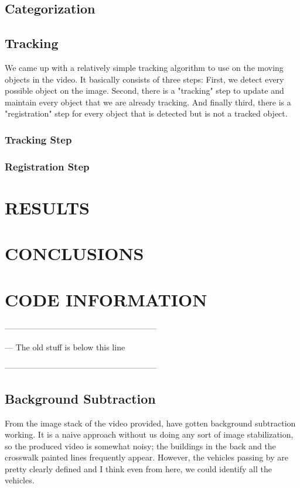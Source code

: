 \documentclass[a4paper, 10pt, conference]{ieeeconf}      %
\begin{document}
\subsection{Categorization}


\subsection{Tracking}

We came up with a relatively simple tracking algorithm to use on the moving objects in the video. It basically consists of three steps: First, we detect every possible object on the image. Second, there is a "tracking" step to update and maintain every object that we are already tracking. And finally third, there is a "registration" step for every object that is detected but is not a tracked object. 

\subsubsection{Tracking Step}


\subsubsection{Registration Step}


\section{RESULTS}


\section{CONCLUSIONS}


\section{CODE INFORMATION}



--------------------------------------------------------

--- The old stuff is below this line

--------------------------------------------------------



\subsection{Background Subtraction}
From the image stack of the video provided, have gotten background subtraction working. It is a naive approach without us doing any sort of image stabilization, so the produced video is somewhat noisy; the buildings in the back and the crosswalk painted lines frequently appear. However, the vehicles passing by are pretty clearly defined and I think even from here, we could identify all the vehicles.
\end{document}
